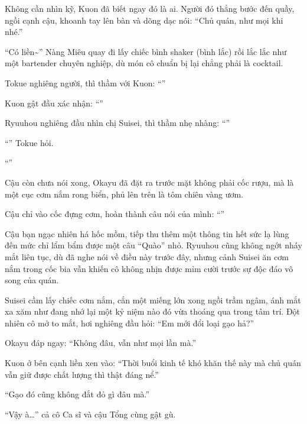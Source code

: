 \documentclass[../main.tex]{subfiles}
\begin{document}
Không cần nhìn kỹ, Kuon đã biết ngay đó là ai. Người đó thẳng bước đến quầy, ngồi cạnh cậu, khoanh tay lên bàn và dõng dạc nói: ``Chủ quán, như mọi khi nhé.''


``Có liền\~{}'' Nàng Miêu quay đi lấy chiếc bình shaker (bình lắc) rồi lắc lắc như một bartender chuyên nghiệp, dù món cô chuẩn bị lại chẳng phải là cocktail.

Tokue nghiêng người, thì thầm với Kuon: ``''

Kuon gật đầu xác nhận: ``''

Ryuuhou nghiêng đầu nhìn chị Suisei, thì thầm nhẹ nhàng: ``''

``'' Tokue hỏi.

``''

Cậu còn chưa nói xong, Okayu đã đặt ra trước mặt không phải cốc rượu, mà là một cục cơm nắm rong biển, phủ lên trên là tôm chiên vàng ươm.

Cậu chỉ vào cốc đựng cơm, hoàn thành câu nói của mình: ``''

Cậu bạn ngạc nhiên há hốc mồm, tiếp thu thêm một thông tin hết sức lạ lùng đến mức chỉ lẩm bẩm được một câu ``Quào'' nhỏ. Ryuuhou cũng không ngớt nháy mắt liên tục, dù đã nghe nói về điều này trước đây, nhưng cảnh Suisei ăn cơm nắm trong cốc bia vẫn khiến cô không nhịn được mỉm cười trước sự độc đáo vô song của quán.

Suisei cầm lấy chiếc cơm nắm, cắn một miếng lớn xong ngồi trầm ngâm, ánh mắt xa xăm như đang nhớ lại một kỷ niệm nào đó vừa thoáng qua trong tâm trí. Đột nhiên cô mở to mắt, hơi nghiêng đầu hỏi: ``Em mới đổi loại gạo hả?''

Okayu đáp ngay: ``Không đâu, vẫn như mọi lần mà.''

Kuon ở bên cạnh liền xen vào: ``Thời buổi kinh tế khó khăn thế này mà chủ quán vẫn giữ được chất lượng thì thật đáng nể.''

``Gạo đó cũng không đắt đỏ gì đâu mà.''

``Vậy à\dots'' cả cô Ca sĩ và cậu Tổng cùng gật gù.
\end{document}
